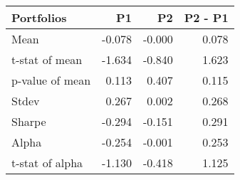 \begin{tabular}{lrrr}
\toprule
Portfolios & P1 & P2 & P2 - P1 \\
\midrule
Mean & -0.078 & -0.000 & 0.078 \\
t-stat of mean & -1.634 & -0.840 & 1.623 \\
p-value of mean & 0.113 & 0.407 & 0.115 \\
Stdev & 0.267 & 0.002 & 0.268 \\
Sharpe & -0.294 & -0.151 & 0.291 \\
Alpha & -0.254 & -0.001 & 0.253 \\
t-stat of alpha & -1.130 & -0.418 & 1.125 \\
\bottomrule
\end{tabular}
